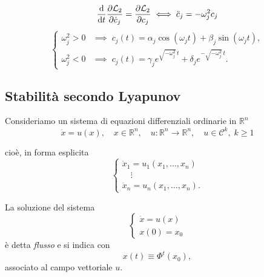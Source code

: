 \begin{remark}
    \begin{equation}
        \dv{t}\pdv{\mathcal{L}_2}{\dot{c}_j}= \pdv{\mathcal{L}_2}{c_j}\iff \ddot{c}_j= - \omega_j^2c_j
    \end{equation}
    \begin{equation}
    \begin{cases}
        \omega_j^2 > 0 
        &\implies \; 
        c_j(t) = \alpha_j \cos(\omega_j t) + \beta_j \sin(\omega_j t), \\[6pt]
        \omega_j^2 < 0 
        &\implies \; 
        c_j(t) = \gamma_j e^{\sqrt{-\omega_j^2}\,t} + \delta_j e^{-\sqrt{-\omega_j^2}\,t}.
    \end{cases}
    \end{equation}
\end{remark}



\subsection{Stabilità secondo Lyapunov}

Consideriamo un sistema di equazioni differenziali ordinarie in $\mathbb{R}^n$
\begin{equation}
    \dot{x} = u(x), \quad x \in \mathbb{R}^n, \quad u : \mathbb{R}^n \to \mathbb{R}^n, \quad u \in \mathcal{C}^k, \; k \geq 1
\end{equation}

cioè, in forma esplicita
\begin{equation*}
    \begin{cases}
        \dot{x}_1 = u_1(x_1, \dots, x_n) \\
        \quad \vdots \\
        \dot{x}_n = u_n(x_1, \dots, x_n).
    \end{cases}
\end{equation*}

La soluzione del sistema
\begin{equation}
    \begin{cases}
        \dot{x} = u(x) \\
        x(0) = x_0
    \end{cases}
\end{equation}
è detta \textit{flusso} e si indica con
\begin{equation}
    x(t) \equiv \Phi^t(x_0),
\end{equation}
associato al campo vettoriale $u$.

